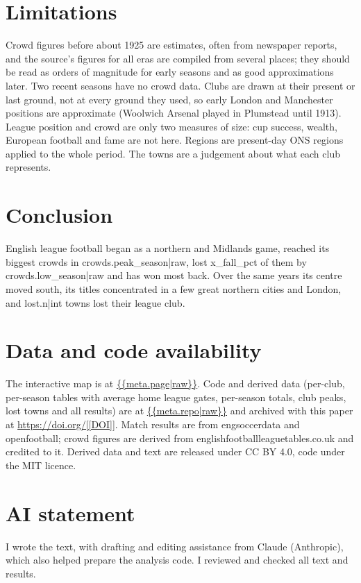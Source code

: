 \documentclass[11pt,a4paper]{article}
\begin{document}
\section{Limitations}
Crowd figures before about 1925 are estimates, often from newspaper reports, and the source's figures for all eras are compiled from several places; they should be read as orders of magnitude for early seasons and as good approximations later. Two recent seasons have no crowd data. Clubs are drawn at their present or last ground, not at every ground they used, so early London and Manchester positions are approximate (Woolwich Arsenal played in Plumstead until 1913). League position and crowd are only two measures of size: cup success, wealth, European football and fame are not here. Regions are present-day ONS regions applied to the whole period. The towns are a judgement about what each club represents.

\section{Conclusion}
English league football began as a northern and Midlands game, reached its biggest crowds in {{crowds.peak_season|raw}}, lost {{x_fall_pct}} of them by {{crowds.low_season|raw}} and has won most back. Over the same years its centre moved south, its titles concentrated in a few great northern cities and London, and {{lost.n|int}} towns lost their league club.

\section*{Data and code availability}
The interactive map is at \url{{{meta.page|raw}}}. Code and derived data (per-club, per-season tables with average home league gates, per-season totals, club peaks, lost towns and all results) are at \url{{{meta.repo|raw}}} and archived with this paper at \url{https://doi.org/[[DOI]]}. Match results are from engsoccerdata and openfootball; crowd figures are derived from englishfootballleaguetables.co.uk and credited to it. Derived data and text are released under CC BY 4.0, code under the MIT licence.

\section*{AI statement}
I wrote the text, with drafting and editing assistance from Claude (Anthropic), which also helped prepare the analysis code. I reviewed and checked all text and results.
\end{document}
